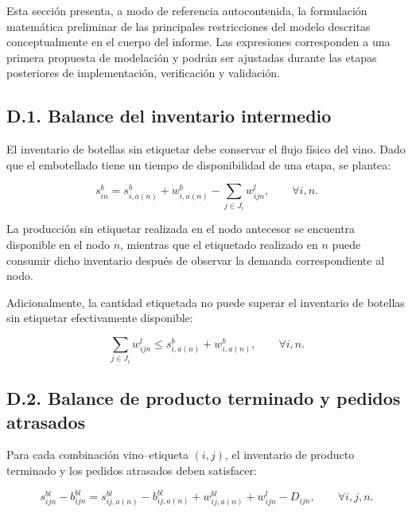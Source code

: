Esta sección presenta, a modo de referencia autocontenida, la formulación
matemática preliminar de las principales restricciones del modelo descritas
conceptualmente en el cuerpo del informe. Las expresiones corresponden a una
primera propuesta de modelación y podrán ser ajustadas durante las etapas
posteriores de implementación, verificación y validación.

\subsection*{D.1. Balance del inventario intermedio}

El inventario de botellas sin etiquetar debe conservar el flujo físico del
vino. Dado que el embotellado tiene un tiempo de disponibilidad de una etapa,
se plantea:

\begin{equation}
    s^{b}_{in}
    =
    s^{b}_{i,a(n)}
    +
    w^{b}_{i,a(n)}
    -
    \sum_{j\in J_i} w^{l}_{ijn},
    \qquad \forall i,n.
    \label{eq:anexoD-balance-intermedio}
\end{equation}

La producción sin etiquetar realizada en el nodo antecesor se encuentra
disponible en el nodo $n$, mientras que el etiquetado realizado en $n$ puede
consumir dicho inventario después de observar la demanda correspondiente al
nodo.

Adicionalmente, la cantidad etiquetada no puede superar el inventario de
botellas sin etiquetar efectivamente disponible:

\begin{equation}
    \sum_{j\in J_i} w^{l}_{ijn}
    \leq
    s^{b}_{i,a(n)}
    +
    w^{b}_{i,a(n)},
    \qquad \forall i,n.
    \label{eq:anexoD-disponibilidad-intermedia}
\end{equation}


\subsection*{D.2. Balance de producto terminado y pedidos atrasados}

Para cada combinación vino--etiqueta $(i,j)$, el inventario de producto
terminado y los pedidos atrasados deben satisfacer:

\begin{equation}
    s^{bl}_{ijn}
    -
    b^{bl}_{ijn}
    =
    s^{bl}_{ij,a(n)}
    -
    b^{bl}_{ij,a(n)}
    +
    w^{bl}_{ij,a(n)}
    +
    w^{l}_{ijn}
    -
    D_{ijn},
    \qquad \forall i,j,n.
    \label{eq:anexoD-balance-terminado}
\end{equation}

